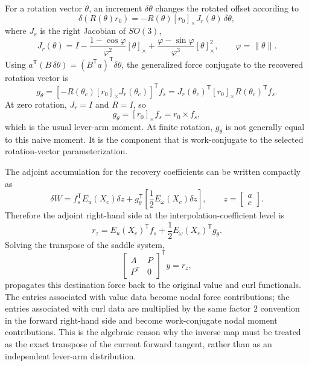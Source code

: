 \documentclass[11pt,a4paper]{article}
\newcommand{\T}{\mathsf{T}}
\begin{document}
For a rotation vector \(\theta\), an increment \(\delta\theta\) changes the
rotated offset according to
\begin{equation}
  \delta\left(R(\theta)r_0\right)
  =
  -R(\theta)[r_0]_\times J_r(\theta)\,\delta\theta ,
  \label{eq:finite_hybrid_offset_tangent}
\end{equation}
where \(J_r\) is the right Jacobian of \(SO(3)\),
\begin{equation}
 J_r(\theta)=I-\frac{1-\cos\varphi}{\varphi^2}[\theta]_\times
 +\frac{\varphi-\sin\varphi}{\varphi^3}[\theta]_\times^2,
 \qquad
 \varphi=\|\theta\|.
 \label{eq:finite_hybrid_right_jacobian}
\end{equation}
Using \(a^\T(B\,\delta\theta)=(B^\T a)^\T\delta\theta\), the generalized
force conjugate to the recovered rotation vector is
\begin{equation}
  g_\theta
  =
  \left[-R(\theta_c)[r_0]_\times J_r(\theta_c)\right]^\T f_s
  =
  J_r(\theta_c)^\T [r_0]_\times R(\theta_c)^\T f_s .
  \label{eq:finite_hybrid_rotation_generalized_force}
\end{equation}
At zero rotation, \(J_r=I\) and \(R=I\), so
\[
  g_\theta=[r_0]_\times f_s=r_0\times f_s,
\]
which is the usual lever-arm moment.  At finite rotation, \(g_\theta\) is not
generally equal to this naive moment.  It is the component that is
work-conjugate to the selected rotation-vector parameterization.

The adjoint accumulation for the recovery coefficients can be written
compactly as
\[
  \delta W
  =
  f_s^\T E_u(X_c)\delta z
  +
  g_\theta^\T
  \left[\frac12 E_\omega(X_c)\delta z\right],
  \qquad
  z=\begin{bmatrix}a\\c\end{bmatrix}.
\]
Therefore the adjoint right-hand side at the interpolation-coefficient level
is
\begin{equation}
  r_z
  =
  E_u(X_c)^\T f_s
  +
  \frac12 E_\omega(X_c)^\T g_\theta .
  \label{eq:finite_hybrid_coefficient_adjoint_rhs}
\end{equation}
Solving the transpose of the saddle system,
\[
      \begin{bmatrix}
        A & P\\
        P^\T & 0
      \end{bmatrix}^{\T}
      y
      =
      r_z ,
\]
propagates this destination force back to the original value and curl
functionals.  The entries associated with value data become nodal force
contributions; the entries associated with curl data are multiplied by the
same factor \(2\) convention in the forward right-hand side and become
work-conjugate nodal moment contributions.  This is the algebraic reason why
the inverse map must be treated as the exact transpose of the current forward
tangent, rather than as an independent lever-arm distribution.
\end{document}
